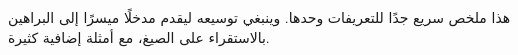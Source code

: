 \documentclass[../../../include/open-logic-chapter]{subfiles}
\begin{document}

\begin{editorial}
  هذا ملخص سريع جدًا للتعريفات وحدها. وينبغي توسيعه ليقدم مدخلًا
  ميسرًا إلى البراهين بالاستقراء على الصيغ، مع أمثلة إضافية كثيرة.
\end{editorial}







\OLEndChapterHook
\end{document}
